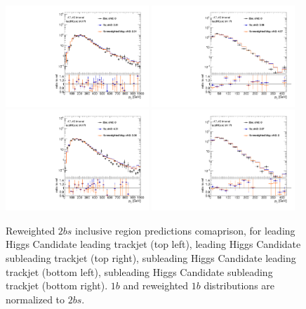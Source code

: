 \begin{figure}[htbp!]
\begin{center}
\includegraphics[width=0.48\textwidth,angle=-90]{figures/boosted/AppendixReweight/Compare/Dijet_Incl_directcompare_leadHCand_trk0_Pt_1.pdf}
\includegraphics[width=0.48\textwidth,angle=-90]{figures/boosted/AppendixReweight/Compare/Dijet_Incl_directcompare_leadHCand_trk1_Pt_1.pdf}\\
\includegraphics[width=0.48\textwidth,angle=-90]{figures/boosted/AppendixReweight/Compare/Dijet_Incl_directcompare_sublHCand_trk0_Pt_1.pdf}
\includegraphics[width=0.48\textwidth,angle=-90]{figures/boosted/AppendixReweight/Compare/Dijet_Incl_directcompare_sublHCand_trk1_Pt_1.pdf}\\
\caption{Reweighted $2bs$ inclusive region predictions comaprison, for leading Higgs Candidate leading trackjet \pt (top left),  leading Higgs Candidate subleading trackjet \pt (top right), subleading Higgs Candidate leading trackjet \pt (bottom left), subleading Higgs Candidate subleading trackjet \pt (bottom right). $1b$ and reweighted $1b$ distributions are normalized to $2bs$.}
\label{fig:app-rw-comp-dijet-2bs-trkjet}
\end{center}
\end{figure}


